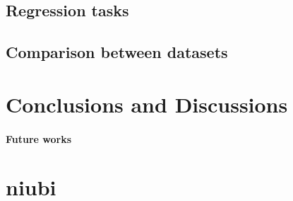 \documentclass[sigconf]{acmart}
\begin{document}
\paragraph{}

\subsection{Regression tasks}







\subsection{Comparison between datasets}



\section{Conclusions and Discussions}




\paragraph{Future works}










\appendix

\section{niubi}
\end{document}
